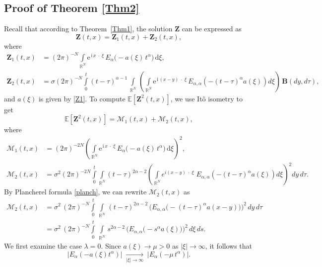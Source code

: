 \documentclass[12pt, reqno]{amsart}
\newcommand{\R}{\ensuremath{\mathbb{R}}}
\newcommand{\bz}{\ensuremath{\mathbf{Z}}}
\newcommand{\bb}{\ensuremath{\mathbf{B}}}
\begin{document}
\subsection{Proof of Theorem \ref{Thm2}} 
Recall that according to Theorem~\ref{Thm1}, the solution $\bz$ can be expressed as 
\begin{equation}
    \label{ZZ}
    \bz(t,x)=\bz_1(t,x)+\bz_2(t,x),
\end{equation}
where 
\begin{equation}
    \label{z12}
    \begin{split}
        \bz_1(t,x)&= (2\pi)^{-N}
   \int\limits_{\R^N} 
   \mathrm{e}^{\,\mathrm{i}\, x\;\cdot\;\xi}\,
   E_{\alpha}\!\big(-a(\xi)\, t^{\alpha}\big)\,
   \mathrm{d}\xi,\\
        \bz_2(t,x)&=\sigma(2\pi)^{-N}
   \int\limits_{0}^{t}(t-\tau)^{\alpha-1}\,\int\limits_{\R^N}\,\left(\int\limits_{\R^N}
   \mathrm{e}^{\,\mathrm{i}\,(x-y)\;\cdot\;\xi}\,
   E_{\alpha, \alpha}\left(-(t-\tau)^\alpha a(\xi)\right)d\xi\right)\,
   \bb(dy, d\tau),
    \end{split}
\end{equation}
and $a(\xi)$ is given by \eqref{Z1}. To compute $\mathbb{E}\left[\bz^2(t,x)\right]$, we use It\^o isometry to get
\begin{equation}
    \label{EST-1}
  \mathbb{E}\left[\bz^2(t,x)\right]=\mathcal{M}_1(t,x)+ \mathcal{M}_2(t,x), 
\end{equation}
where
\begin{equation}
    \label{Est-2}
    \begin{split}
        \mathcal{M}_1(t,x)&=(2\pi)^{-2N}\left(
   \int\limits_{\R^N} 
   \mathrm{e}^{\,\mathrm{i}\, x\;\cdot\;\xi}\,
   E_{\alpha}\!\big(-a(\xi)\, t^{\alpha}\big)\,
   \mathrm{d}\xi\right)^2,\\
        \mathcal{M}_2(t,x)&=\sigma^{2} (2\pi)^{-2N} 
\int\limits_{0}^{t} \int\limits_{\mathbb{R}^{N}} 
(t - \tau)^{2\alpha - 2} 
\left( 
    \int\limits_{\mathbb{R}^{N}} 
        e^{i(x - y)\;\cdot\;\xi}\;
        E_{\alpha, \alpha}\!\left(-(t - \tau)^{\alpha} a(\xi)\right)
    d\xi
\right)^{2} 
dy\,d\tau.
    \end{split}
\end{equation}
By Plancherel formula \eqref{planch}, we can rewrite $\mathcal{M}_2(t,x)$ as
\begin{equation}
    \label{M-2-planch}
    \begin{split}
    \mathcal{M}_2(t,x)&=\sigma^2\,(2\pi)^{-N}\int\limits_0^t\,\int\limits_{\R^N}\,(t - \tau)^{2\alpha - 2}\, \bigg( E_{\alpha, \alpha} \big(-(t - \tau)^{\alpha} a(x-y)\big)\bigg)^2\,dy\,d\tau\\
    &=\sigma^2\,(2\pi)^{-N}\int\limits_0^t\,\int\limits_{\R^N}\,s^{2\alpha - 2}\,\bigg( E_{\alpha, \alpha} \big(-s^{\alpha} a(\xi)\big)\bigg)^2\,d\xi\,ds.
    \end{split}
\end{equation}
We first examine the case $\lambda=0$. Since $a(\xi)\to\mu>0$ as $|\xi|\to\infty$, it follows that
\begin{equation}
\label{lambda0}
\bigl|E_{\alpha}(-a(\xi)t^{\alpha})\bigr|
\;\xrightarrow[|\xi|\to\infty]{}\;
\bigl|E_{\alpha}(-\mu\,t^{\alpha})\bigr|.
\end{equation}
\end{document}
